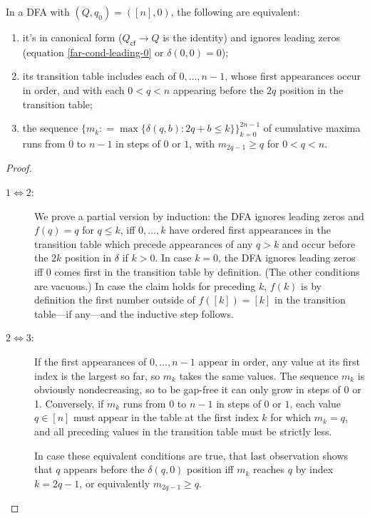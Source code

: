 \begin{lemma}
  \label{far-dfa-canonical form}
  In a DFA with $(Q,q_0)=([n],0)$, the following are equivalent:
  \begin{enumerate}
    \item it's in canonical form ($Q_\textsf{cf}\to Q$ is the identity)
          and ignores leading zeros (equation \eqref{far-cond-leading-0} or $\delta(0,0)=0$);
    \item its transition table includes each of $0,\ldots,n-1$, whose first appearances occur in order,
          and with each $0 < q < n$ appearing before the $2q$ position in the transition table;
    \item the sequence $\{m_k \mathrel{\mathop:}= \max\{\delta(q,b): 2q+b\le k\}\}_{k=0}^{2n-1}$ of cumulative maxima runs from $0$ to $n-1$ in steps of $0$ or $1$,
          with $m_{2q-1}\ge q$ for $0<q<n$.
  \end{enumerate}
\end{lemma}
\begin{proof}
  \begin{description}
    \item[$1\iff 2$:]
          We prove a partial version by induction:
          the DFA ignores leading zeros and $f(q)=q$ for $q\le k$,
          iff $0,\ldots,k$ have ordered first appearances in the transition table
          which precede appearances of any $q>k$
          and occur before the $2k$ position in $\delta$ if $k>0$.
          In case $k=0$, the DFA ignores leading zeros iff $0$ comes first in the transition table by definition.
          (The other conditions are vacuous.)
          In case the claim holds for preceding $k$, $f(k)$ is by definition the first number outside of $f([k])=[k]$ in the transition table---if any---and the inductive step follows.
    \item[$2\iff 3$:]
          If the first appearances of $0,\ldots,n-1$ appear in order, any value at its first index is the largest so far, so $m_k$ takes the same values. The sequence $m_k$ is obviously nondecreasing, so to be gap-free it can only grow in steps of 0 or 1.
          Conversely, if $m_k$ runs from $0$ to $n-1$ in steps of $0$ or $1$, each value $q\in [n]$ must appear in the table at the first index $k$ for which $m_k=q$, and all preceding values in the transition table must be strictly less.

          In case these equivalent conditions are true, that last observation shows that $q$ appears before the $\delta(q,0)$ position iff $m_k$ reaches $q$ by index $k=2q-1$, or equivalently $m_{2q-1}\ge q$.
  \end{description}
\end{proof}

